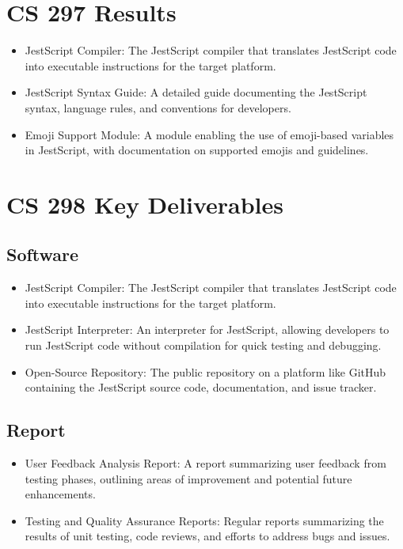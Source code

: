 \documentclass[11pt,onecolumn]{sjsucs-proposal}
\begin{document}
\section{CS 297 Results}

\begin{itemize}
    \item JestScript Compiler: The JestScript compiler that translates JestScript code into executable instructions for the target platform.
    \item JestScript Syntax Guide: A detailed guide documenting the JestScript syntax, language rules, and conventions for developers.
    \item Emoji Support Module: A module enabling the use of emoji-based variables in JestScript, with documentation on supported emojis and guidelines.
\end{itemize}

\section{CS 298 Key Deliverables}
\subsection{Software}
\begin{itemize}
  \item JestScript Compiler: The JestScript compiler that translates JestScript code into executable instructions for the target platform.
  \item JestScript Interpreter: An interpreter for JestScript, allowing developers to run JestScript code without compilation for quick testing and debugging.
  \item Open-Source Repository: The public repository on a platform like GitHub containing the JestScript source code, documentation, and issue tracker.
\end{itemize}


\subsection{Report}
\begin{itemize}
  \item User Feedback Analysis Report: A report summarizing user feedback from testing phases, outlining areas of improvement and potential future enhancements.
  \item Testing and Quality Assurance Reports: Regular reports summarizing the results of unit testing, code reviews, and efforts to address bugs and issues.
\end{itemize}
\end{document}
